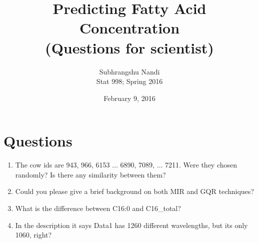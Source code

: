 \documentclass[11pt,a4paper]{article}
\begin{document}
\title{Predicting Fatty Acid Concentration \\
(Questions for scientist)}
\author{Subhrangshu Nandi\\
  Stat 998; Spring 2016}
\date{February 9, 2016}

\maketitle

\section*{Questions}
\begin{enumerate}
\item The cow ids are 943, 966, 6153 $\dots$ 6890, 7089, $\dots$ 7211. Were they chosen randomly? Is there any similarity between them?
\item Could you please give a brief background on both MIR and GQR techniques?
\item What is the difference between C16:0 and C16\_total?
\item In the description it says Data1 has 1260 different wavelengths, but its only 1060, right?

\end{enumerate}
\end{document}
